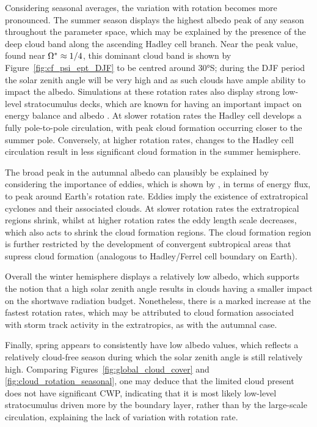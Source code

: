 Considering seasonal averages, the variation with rotation becomes more pronounced. The summer season displays the highest albedo peak of any season throughout the parameter space, which may be explained by the presence of the deep cloud band along the ascending Hadley cell branch. Near the peak value, found near $\Omega^*\approx 1/4$, this dominant cloud band is shown by Figure~\ref{fig:cf_psi_ept_DJF} to be centred around \ang{30}S; during the DJF period the solar zenith angle will be very high and as such clouds have ample ability to impact the albedo. Simulations at these rotation rates also display strong low-level stratocumulus decks, which are known for having an important impact on energy balance and albedo \citep{slingo1990-Sensitivity, hartmann1992-Effect}. At slower rotation rates the Hadley cell develops a fully pole-to-pole circulation, with peak cloud formation occurring closer to the summer pole.  Conversely, at higher rotation rates, changes to the Hadley cell circulation result in less significant cloud formation in the summer hemisphere. 

The broad peak in the autumnal albedo can plausibly be explained by considering the importance of eddies, which is shown by \citet{kaspi2015-ATMOSPHERIC}, in terms of energy flux, to peak around Earth's rotation rate. Eddies imply the existence of extratropical cyclones and their associated clouds. At slower rotation rates the extratropical regions shrink, whilst at higher rotation rates the eddy length scale decreases, which also acts to shrink the cloud formation regions. The cloud formation region is further restricted by the development of convergent subtropical areas that supress cloud formation (analogous to Hadley/Ferrel cell boundary on Earth).

Overall the winter hemisphere displays a relatively low albedo, which supports the notion that a high solar zenith angle results in clouds having a smaller impact on the shortwave radiation budget. Nonetheless, there is a marked increase at the fastest rotation rates, which may be attributed to cloud formation associated with storm track activity in the extratropics, as with the autumnal case.

Finally, spring appears to consistently have low albedo values, which reflects a relatively cloud-free season during which the solar zenith angle is still relatively high. Comparing Figures~\ref{fig:global_cloud_cover} and \ref{fig:cloud_rotation_seasonal}, one may deduce that the limited cloud present does not have significant CWP, indicating that it is most likely low-level stratocumulus driven more by the boundary layer, rather than by the large-scale circulation, explaining the lack of variation with rotation rate.

